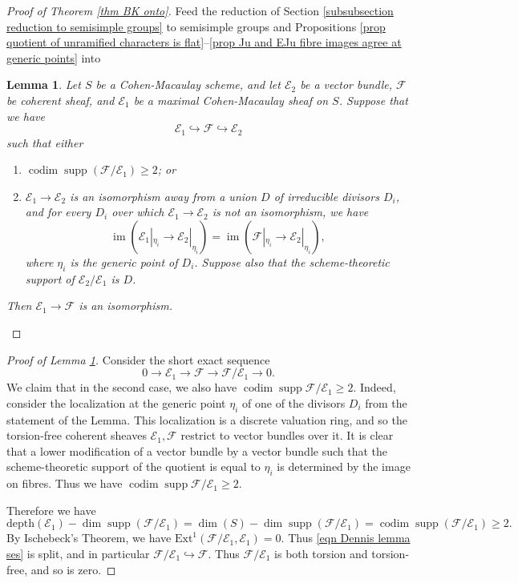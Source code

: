 \documentclass[10pt]{article}
\DeclareMathOperator{\codim}{codim}
\def\into{\mathrel{\hookrightarrow}}
\DeclareMathOperator{\im}{\mathrm{im}}
\newcommand{\Ext}{\mathrm{Ext}}
\newcommand{\Ff}{\mathcal{F}}
\newcommand{\Ee}{\mathcal{E}}
\DeclareMathOperator{\supp}{supp}
\newtheorem{lem}{Lemma}
\theoremstyle{definition}
\theoremstyle{remark}
\begin{document}
\begin{proof}[Proof of Theorem \ref{thm BK onto}]

Feed the reduction of Section \ref{subsubsection reduction to semisimple groups} to semisimple groups and Propositions \ref{prop quotient of unramified characters is flat}--\ref{prop Ju and EJu fibre images agree at generic points} into
%
\begin{lem}
\label{lem Dennis}
Let $S$ be a Cohen-Macaulay scheme,
and let $\Ee_2$ be a vector bundle, $\Ff$ be coherent
sheaf, and $\Ee_1$ be a maximal Cohen-Macaulay sheaf on $S$. Suppose that we have
%
\[
\Ee_1\into\Ff\into\Ee_2
\]
%
such that either
%
\begin{enumerate}
\item 
$\codim\supp\left(\Ff/\Ee_1\right)\geq 2$; or
%
\item
$\Ee_1\to\Ee_2$ is an isomorphism away from a union $D$ of irreducible divisors $D_i$, and for 
every $D_i$ over which $\Ee_1\to\Ee_2$ is not an isomorphism, we have
%
\begin{equation}
\im(\Ee_1|_{\eta_i}\to\Ee_2|_{\eta_i})=\im(\Ff|_{\eta_i}\to\Ee_2|_{\eta_i}),
\end{equation}
%
where $\eta_i$ is the generic point of $D_i$.  Suppose also that the scheme-theoretic support 
of $\Ee_2/\Ee_1$ is $D$.
\end{enumerate}
%
Then $\Ee_1\to\Ff$ is an isomorphism.
\end{lem}
%
\end{proof}
%
\begin{proof}[Proof of Lemma \ref{lem Dennis}]
Consider the short exact sequence
%
\begin{equation}
\label{eqn Dennis lemma ses}
0\to\Ee_1\to\Ff\to\Ff/\Ee_1\to 0.
\end{equation}
%
We claim that in the second case, we also have $\codim\supp\Ff/\Ee_1\geq 2$. Indeed, consider the localization
at the generic point $\eta_i$ of one of the divisors $D_i$ from the statement of the Lemma.
This localization is a discrete valuation ring, and so the torsion-free coherent sheaves $\Ee_1, \Ff$ restrict
to vector bundles over it. It is clear that a lower modification of a vector bundle by a vector 
bundle such that the scheme-theoretic support of the quotient is equal to 
$\eta_i$ is determined
by the image on fibres. Thus we have $\codim\supp\Ff/\Ee_1\geq 2$.

Therefore we have
%
\[
\mathrm{depth}(\Ee_1)-\dim\supp(\Ff/\Ee_1)=\dim(S)-\dim\supp(\Ff/\Ee_1)=\codim\supp(\Ff/\Ee_1)\geq 2.
\]
%
By Ischebeck's Theorem, we have $\Ext^1(\Ff/\Ee_1,\Ee_1)=0$.
Thus \eqref{eqn Dennis lemma ses} is split, and in particular
$\Ff/\Ee_1\into\Ff$. Thus $\Ff/\Ee_1$ is both torsion and torsion-free, and so is zero.
\end{proof}
%
\end{document}
